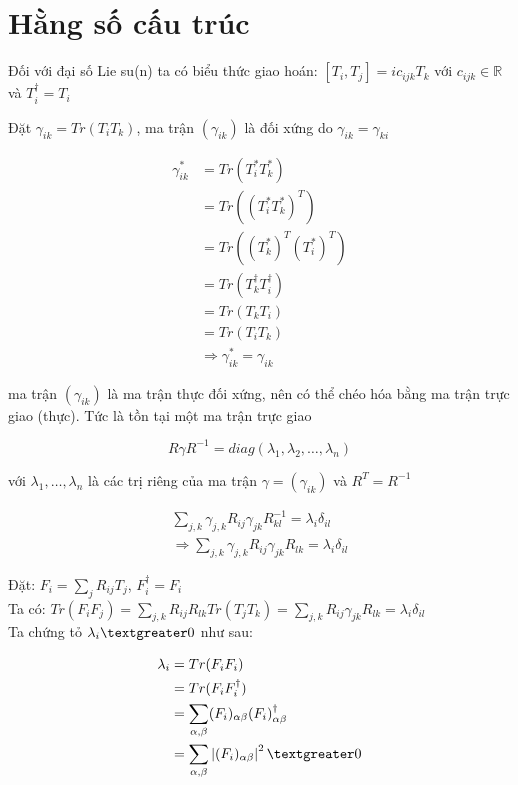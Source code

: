 \documentclass{report}
\begin{document}
\section{Hằng số cấu trúc}

Đối với đại số Lie su(n) ta có biểu thức giao hoán: \([T_{i},T_{j}]=ic_{ijk}T_{k}\) với \(c_{ijk} \in \mathbb{R} \) và \(T_{i}^{\dagger}=T_{i}\)
	
Đặt \(\gamma_{ik} = Tr(T_{i}T_{k})\), ma trận \((\gamma_{ik})\) là đối xứng do	\(\gamma_{ik} = \gamma_{ki}\) 
	
	\begin{align*}
		\gamma_{ik}^{*} & = Tr(T_{i}^{*}T_{k}^{*}) \\
		& = Tr((T_{i}^{*}T_{k}^{*})^{T}) \\
		& = Tr((T_{k}^{*})^{T}(T_{i}^{*})^{T}) \\
		& = Tr(T_{k}^{\dagger}T_{i}^{\dagger}) \\
		& = Tr(T_{k}T_{i}) \\
		& = Tr(T_{i}T_{k}) \\
		& \Rightarrow \gamma_{ik}^{*} = \gamma_{ik}
	\end{align*}
	
ma trận \((\gamma_{ik})\) là ma trận thực đối xứng, nên có thể chéo hóa bằng ma trận trực giao (thực). Tức là tồn tại một ma trận trực giao

\[ R \gamma R^{-1} = diag(\lambda_{1},\lambda_{2},\dots,\lambda_{n})\]

với \( \lambda_{1},\dots,\lambda_{n} \) là các trị riêng của ma trận \(\gamma = (\gamma_{ik}) \) và \(R^{T} = R^{-1}\) 

	\begin{align*}
		\sum_{j,k} \gamma_{j,k} R_{ij} \gamma_{jk} R_{kl}^{-1} = \lambda_{i} \delta_{il} \\
		\Rightarrow \sum_{j,k} \gamma_{j,k} R_{ij} \gamma_{jk} R_{lk} = \lambda_{i} \delta_{il} 
	\end{align*}
	
Đặt: \(F_{i} = \sum_{j} R_{ij} T_{j}\), \(F_{i}^{\dagger} = F_{i} \)\\

Ta có: \(Tr(F_{i}F_{j}) = \sum_{j,k} R_{ij}R_{lk}Tr(T_{j}T_{k}) = \sum_{j,k}R_{ij}\gamma_{jk}R_{lk} = \lambda_{i}\delta_{il}\)\\

Ta chứng tỏ \(\lambda_{i} \textgreater 0 \) như sau:

	\begin{align*}
		\lambda_{i} & = Tr(F_{i}F_{i}) \\ 
		& = Tr(F_{i}F_{i}^{\dagger}) \\
		& = \sum_{\alpha,\beta} (F_{i})_{\alpha \beta} (F_{i})_{\alpha \beta}^{\dagger} \\
		& = \sum_{\alpha,\beta} \left| {(F_{i})_{\alpha \beta}} \right|^{2} \textgreater 0 \\
	\end{align*}
	
\end{document}
